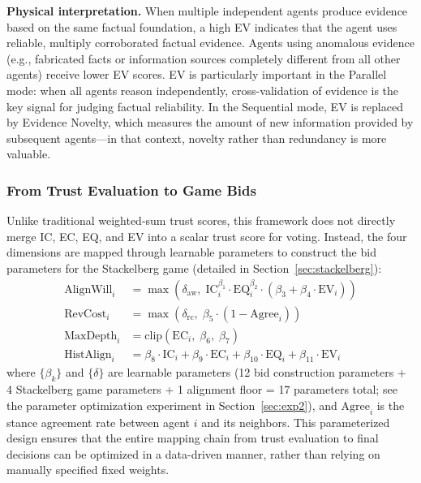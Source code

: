 \documentclass[12pt,a4paper]{article}
\begin{document}
\textbf{Physical interpretation.} When multiple independent agents produce evidence based on the same factual foundation, a high EV indicates that the agent uses reliable, multiply corroborated factual evidence. Agents using anomalous evidence (e.g., fabricated facts or information sources completely different from all other agents) receive lower EV scores. EV is particularly important in the Parallel mode: when all agents reason independently, cross-validation of evidence is the key signal for judging factual reliability. In the Sequential mode, EV is replaced by Evidence Novelty, which measures the amount of new information provided by subsequent agents---in that context, novelty rather than redundancy is more valuable.

\subsubsection{From Trust Evaluation to Game Bids}

Unlike traditional weighted-sum trust scores, this framework does not directly merge IC, EC, EQ, and EV into a scalar trust score for voting. Instead, the four dimensions are mapped through learnable parameters to construct the bid parameters for the Stackelberg game (detailed in Section~\ref{sec:stackelberg}):
\begin{align}
\text{AlignWill}_i &= \max\!\left(\delta_{\text{aw}},\; \text{IC}_i^{\beta_1} \cdot \text{EQ}_i^{\beta_2} \cdot (\beta_3 + \beta_4 \cdot \text{EV}_i)\right) \label{eq:bid_aw} \\
\text{RevCost}_i &= \max\!\left(\delta_{\text{rc}},\; \beta_5 \cdot (1 - \text{Agree}_i)\right) \label{eq:bid_rc} \\
\text{MaxDepth}_i &= \text{clip}(\text{EC}_i,\; \beta_6,\; \beta_7) \label{eq:bid_mrd} \\
\text{HistAlign}_i &= \beta_8 \cdot \text{IC}_i + \beta_9 \cdot \text{EC}_i + \beta_{10} \cdot \text{EQ}_i + \beta_{11} \cdot \text{EV}_i \label{eq:bid_ha}
\end{align}
where $\{\beta_k\}$ and $\{\delta\}$ are learnable parameters (12 bid construction parameters + 4 Stackelberg game parameters + 1 alignment floor = 17 parameters total; see the parameter optimization experiment in Section~\ref{sec:exp2}), and $\text{Agree}_i$ is the stance agreement rate between agent $i$ and its neighbors. This parameterized design ensures that the entire mapping chain from trust evaluation to final decisions can be optimized in a data-driven manner, rather than relying on manually specified fixed weights.
\end{document}
